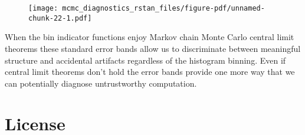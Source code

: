 \documentclass[
  letterpaper,
  DIV=11,
  numbers=noendperiod]{scrartcl}
\newenvironment{Shaded}{\begin{snugshade}}{\end{snugshade}}
\newcommand{\AttributeTok}[1]{\textcolor[rgb]{0.40,0.45,0.13}{#1}}
\newcommand{\DecValTok}[1]{\textcolor[rgb]{0.68,0.00,0.00}{#1}}
\newcommand{\FunctionTok}[1]{\textcolor[rgb]{0.28,0.35,0.67}{#1}}
\newcommand{\NormalTok}[1]{\textcolor[rgb]{0.00,0.23,0.31}{#1}}
\newcommand{\SpecialCharTok}[1]{\textcolor[rgb]{0.37,0.37,0.37}{#1}}
\newcommand{\StringTok}[1]{\textcolor[rgb]{0.13,0.47,0.30}{#1}}
\begin{document}
\begin{Shaded}
\end{Shaded}

\begin{figure}[H]

{\centering \texttt{[image: mcmc\_diagnostics\_rstan\_files/figure-pdf/unnamed-chunk-22-1.pdf]}

}

\end{figure}

When the bin indicator functions enjoy Markov chain Monte Carlo central
limit theorems these standard error bands allow us to discriminate
between meaningful structure and accidental artifacts regardless of the
histogram binning. Even if central limit theorems don't hold the error
bands provide one more way that we can potentially diagnose
untrustworthy computation.

\hypertarget{license}{%
\section*{License}\label{license}}
\end{document}
